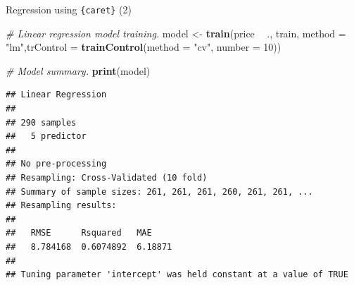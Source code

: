 \documentclass[12pt,ignorenonframetext,]{beamer}
\newenvironment{Shaded}{\begin{snugshade}}{\end{snugshade}}
\newcommand{\CommentTok}[1]{\textcolor[rgb]{0.56,0.35,0.01}{\textit{#1}}}
\newcommand{\DataTypeTok}[1]{\textcolor[rgb]{0.13,0.29,0.53}{#1}}
\newcommand{\DecValTok}[1]{\textcolor[rgb]{0.00,0.00,0.81}{#1}}
\newcommand{\KeywordTok}[1]{\textcolor[rgb]{0.13,0.29,0.53}{\textbf{#1}}}
\newcommand{\NormalTok}[1]{#1}
\newcommand{\OperatorTok}[1]{\textcolor[rgb]{0.81,0.36,0.00}{\textbf{#1}}}
\newcommand{\StringTok}[1]{\textcolor[rgb]{0.31,0.60,0.02}{#1}}
\begin{document}
\begin{frame}[fragile]{Regression using \texttt{\{caret\}} (2)}
\protect\hypertarget{regression-using-2}{}

\tiny

\begin{Shaded}
\begin{Highlighting}[]
\CommentTok{# Linear regression model training.}
\NormalTok{model <-}\StringTok{ }\KeywordTok{train}\NormalTok{(price }\OperatorTok{~}\StringTok{ }\NormalTok{., train, }\DataTypeTok{method =} \StringTok{"lm"}\NormalTok{,}\DataTypeTok{trControl =} \KeywordTok{trainControl}\NormalTok{(}\DataTypeTok{method =} \StringTok{"cv"}\NormalTok{,}
                                        \DataTypeTok{number =} \DecValTok{10}\NormalTok{))}

\CommentTok{# Model summary.}
\KeywordTok{print}\NormalTok{(model)}
\end{Highlighting}
\end{Shaded}

\begin{verbatim}
## Linear Regression 
## 
## 290 samples
##   5 predictor
## 
## No pre-processing
## Resampling: Cross-Validated (10 fold) 
## Summary of sample sizes: 261, 261, 261, 260, 261, 261, ... 
## Resampling results:
## 
##   RMSE      Rsquared   MAE    
##   8.784168  0.6074892  6.18871
## 
## Tuning parameter 'intercept' was held constant at a value of TRUE
\end{verbatim}

\normalsize

\end{frame}
\end{document}
